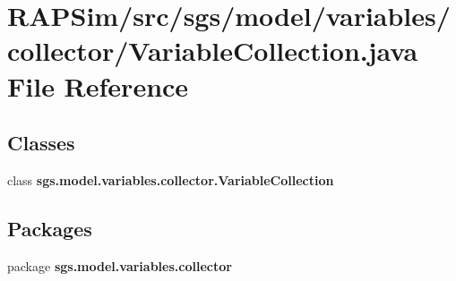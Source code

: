 \section{R\-A\-P\-Sim/src/sgs/model/variables/collector/\-Variable\-Collection.java File Reference}
\label{_variable_collection_8java}
\subsection*{Classes}
\begin{DoxyCompactItemize}
\item 
class {\bf sgs.\-model.\-variables.\-collector.\-Variable\-Collection}
\end{DoxyCompactItemize}
\subsection*{Packages}
\begin{DoxyCompactItemize}
\item 
package {\bf sgs.\-model.\-variables.\-collector}
\end{DoxyCompactItemize}
